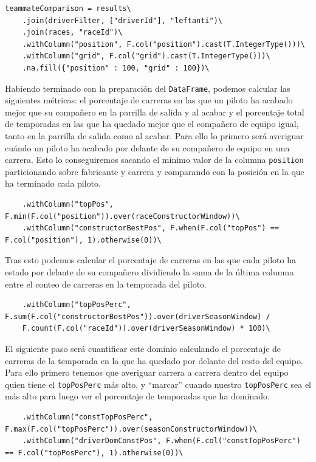 \documentclass[12pt,twoside,titlepage]{report}
\newcommand{\quotes}[1]{``#1''}
\begin{document}
\begin{lstlisting}
teammateComparison = results\
	.join(driverFilter, ["driverId"], "leftanti")\
	.join(races, "raceId")\
	.withColumn("position", F.col("position").cast(T.IntegerType()))\
	.withColumn("grid", F.col("grid").cast(T.IntegerType()))\
	.na.fill({"position" : 100, "grid" : 100})\
\end{lstlisting}

Habiendo terminado con la preparación del \texttt{DataFrame}, podemos calcular las siguientes métricas: el porcentaje de carreras en las que un piloto ha acabado mejor que su compañero en la parrilla de salida y al acabar y el porcentaje total de temporadas en las que ha quedado mejor que el compañero de equipo igual, tanto en la parrilla de salida como al acabar. Para ello lo primero será averiguar cuándo un piloto ha acabado por delante de su compañero de equipo en una carrera. Esto lo conseguiremos sacando el mínimo valor de la columna \texttt{position} particionando sobre fabricante y carrera y comparando con la posición en la que ha terminado cada piloto.

\begin{lstlisting}
	.withColumn("topPos", F.min(F.col("position")).over(raceConstructorWindow))\
	.withColumn("constructorBestPos", F.when(F.col("topPos") == F.col("position"), 1).otherwise(0))\
\end{lstlisting}

Tras esto podemos calcular el porcentaje de carreras en las que cada piloto ha estado por delante de su compañero dividiendo la suma de la última columna entre el conteo de carreras en la temporada del piloto.

\begin{lstlisting}
	.withColumn("topPosPerc", F.sum(F.col("constructorBestPos")).over(driverSeasonWindow) / 
	F.count(F.col("raceId")).over(driverSeasonWindow) * 100)\
\end{lstlisting}

El siguiente paso será cuantificar este dominio calculando el porcentaje de carreras de la temporada en la que ha quedado por delante del resto del equipo. Para ello primero tenemos que averiguar carrera a carrera dentro del equipo quien tiene el \texttt{topPosPerc} más alto, y \quotes{marcar} cuando nuestro \texttt{topPosPerc} sea el más alto para luego ver el porcentaje de temporadas que ha dominado.

\begin{lstlisting}
	.withColumn("constTopPosPerc", F.max(F.col("topPosPerc")).over(seasonConstructorWindow))\
	.withColumn("driverDomConstPos", F.when(F.col("constTopPosPerc") == F.col("topPosPerc"), 1).otherwise(0))\
\end{lstlisting}
\end{document}
